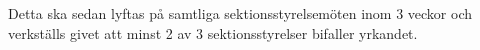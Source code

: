 \documentclass{article}
\begin{document}
Detta ska sedan lyftas på samtliga sektionsstyrelsemöten inom 3 veckor och verkställs givet att minst 2 av 3 sektionsstyrelser bifaller yrkandet.

\begin{comment}
#Övriga tankar från styrIT:
Vem lägger och godkänner budget? Som det ser ut nu i dokumentet ska styrelsen godkänna budgeten, men de har också utgifter. Det känns inte bra att de både skriver och lägger budgeten. Att den går genom sektionsmötena är ju en lösning, men hela poängen med det här var att slippa det. En annan lösning är att spika ett maxbelopp i styrdokumentet för styrelsens möteskostnader.
Är verksamhetsplan en grej? I så fall har den liknande problem som budgeten. Om det inte är en grej, kanske det borde bli

Kanske bättre om två ledamöter sitter på en 2-årsbasis (men olika invalsår) och en på en 1-årsbasis?
\end{comment}
\end{document}
